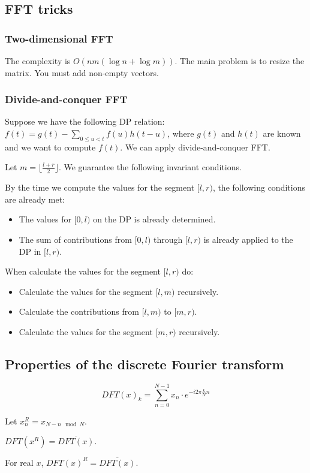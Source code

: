 \subsection*{FFT tricks}
\subsubsection*{Two-dimensional FFT}
The complexity is $O(nm(\log n + \log m))$.
The main problem is to resize the matrix. You must add non-empty vectors.

\subsubsection*{Divide-and-conquer FFT}
Suppose we have the following DP relation: $f(t) = g(t) - \sum_{0 \le u < t} f(u) h(t-u)$,
where $g(t)$ and $h(t)$ are known and we want to compute $f(t)$. We can apply divide-and-conquer FFT.

Let $m = \lfloor\frac{l+r}{2}\rfloor$. We guarantee the following invariant conditions.

By the time we compute the values for the segment $[l,r)$, the following conditions are already met:
\begin{itemize}
\item The values for $[0,l)$ on the DP is already determined.
\item The sum of contributions from $[0,l)$ through $[l,r)$ is already applied to the DP in $[l,r)$.
\end{itemize}

When calculate the values for the segment $[l, r)$ do:
\begin{itemize}
\item Calculate the values for the segment $[l,m)$ recursively.
\item Calculate the contributions from $[l,m)$ to $[m,r)$.
\item Calculate the values for the segment $[m,r)$ recursively.
\end{itemize}

\subsection*{Properties of the discrete Fourier transform}

$$DFT(x)_k = \sum_{n = 0}^{N - 1} x_n \cdot e^{-i 2 \pi \frac{k}{N}n}$$

Let $x^R_n = x_{N - n \mod N}$.

$DFT(x^R) = \overline{DFT(x)}.$

For real $x$, $DFT(x)^R = \overline{DFT(x)}$.